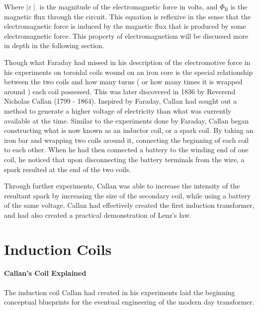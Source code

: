 \documentclass[12pt]{article}
\begin{document}
Where $\mid{\varepsilon}\mid$ is the magnitude of the electromagnetic force in volts, and $\Phi_\text{B}$ is the magnetic flux through the circuit. This equation is reflexive in the sense that the electromagnetic force is induced by the magnetic flux that is produced by some electromagnetic force. This property of electromagnetism will be discussed more in depth in the following section.


Though what Faraday had missed in his description of the electromotive force in his experiments on toroidal coils wound on an iron core is the special relationship between the two coils and how many turns ( or how many times it is wrapped around ) each coil possessed. This was later discovered in 1836 by Reverend Nicholas Callan (1799 - 1864). Inspired by Faraday, Callan had sought out a method to generate a higher voltage of electricity than what was currently available at the time. Similar to the experiments done by Faraday, Callan began constructing what is now known as an inductor coil, or a spark coil. By taking an iron bar and wrapping two coils around it, connecting the beginning of each coil to each other. When he had then connected a battery to the winding end of one coil, he noticed that upon disconnecting the battery terminals from the wire, a spark resulted at the end of the two coils.

Through further experiments, Callan was able to increase the intensity of the resultant spark by increasing the size of the secondary coil, while using a battery of the same voltage. Callan had effectively created the first induction transformer, and had also created a practical demonstration of Lenz's law.

\begin{center}
	\begin{huge}
	\end{huge}
\end{center}


\section{Induction Coils}
\paragraph{Callan's Coil Explained} 
The induction coil Callan had created in his experiments laid the beginning conceptual blueprints for the eventual engineering of the modern day transformer. 
\end{document}

